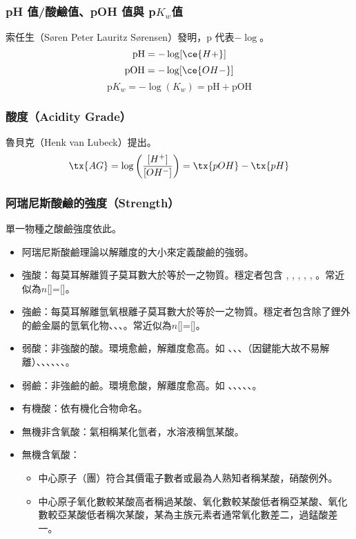 \documentclass[a4paper,12pt]{article}
\begin{document}
\subsubsection{pH 值/酸鹼值、pOH 值與 p$K_w$值}
索任生（Søren Peter Lauritz Sørensen）發明，p 代表$-\log$。
\[\text{pH}=-\log[\ce{H+}]\]
\[\text{pOH}=-\log[\ce{OH-}]\]
\[\text{p}K_w=-\log(K_w)=\text{pH}+\text{pOH}\]
\subsubsection{酸度（Acidity Grade）}
魯貝克（Henk van Lubeck）提出。
\[\tx{AG}=\log\left(\frac{[H^+]}{[OH^-]}\right)=\tx{pOH}-\tx{pH}\]
\subsubsection{阿瑞尼斯酸鹼的強度（Strength）}
單一物種之酸鹼強度依此。
\begin{itemize}
\item 阿瑞尼斯酸鹼理論以解離度的大小來定義酸鹼的強弱。
\item 強酸：每莫耳解離質子莫耳數大於等於一之物質。穩定者包含 , , , , , 。常近似為$n$[]=[]。
\item 強鹼：每莫耳解離氫氧根離子莫耳數大於等於一之物質。穩定者包含除了鋰外的鹼金屬的氫氧化物、、、。常近似為$n$[]=[]。
\item 弱酸：非強酸的酸。環境愈鹼，解離度愈高。如 、、、（因鍵能大故不易解離）、、、、、、。
\item 弱鹼：非強鹼的鹼。環境愈酸，解離度愈高。如 、、、、、。
\end{itemize}
\begin{itemize}
\item 有機酸：依有機化合物命名。
\item 無機非含氧酸：氣相稱某化氫者，水溶液稱氫某酸。
\item 無機含氧酸：
\begin{itemize}
\item 中心原子（團）符合其價電子數者或最為人熟知者稱某酸，硝酸例外。
\item 中心原子氧化數較某酸高者稱過某酸、氧化數較某酸低者稱亞某酸、氧化數較亞某酸低者稱次某酸，某為主族元素者通常氧化數差二，過錳酸差一。
\end{itemize}
\end{itemize}
\end{document}
